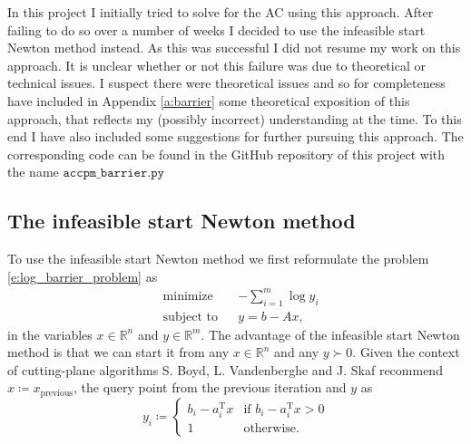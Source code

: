 \documentclass[11pt]{amsart}
\theoremstyle{definition}
\theoremstyle{remark}
\newcommand{\transpose}{\text{T}}
\begin{document}
        In this project I initially tried to solve for the AC using this approach. After failing to do so over a number of weeks I decided to use the infeasible start Newton method instead. As this was successful I did not resume my work on this approach. It is unclear whether or not this failure was due to theoretical or technical issues. I suspect there were theoretical issues and so for completeness have included in Appendix \ref{a:barrier} some theoretical exposition of this approach, that reflects
        my (possibly incorrect) understanding at the time. To this end I have also included some suggestions for further pursuing this approach. The corresponding code can be found in the GitHub repository of this project with the name $\texttt{accpm\_barrier.py}$ 

    \subsection{The infeasible start Newton method}\label{ss:infeasible} To use the infeasible start Newton method we first reformulate the problem \eqref{e:log_barrier_problem} as 
    \begin{equation}\label{e:log_barrier_problem_sub}
        \begin{aligned}
        & \text{minimize} && -\sum_{i=1}^m \log{y_i}  \\
        & \text{subject to} && y = b - Ax, 
        \end{aligned}
    \end{equation}
    in the variables $x \in \mathbb{R}^n$ and $y \in \mathbb{R}^m$. The advantage of the infeasible start Newton method is that we can start it from any $x \in \mathbb{R}^n$ and any $y \succ 0$. Given the context of cutting-plane algorithms S. Boyd, L. Vandenberghe and J. Skaf recommend $x \coloneqq x_\text{previous}$, the query point from the previous iteration and $y$ as 
    \begin{equation*}
        y_i \coloneqq
        \begin{cases} 
            b_i - a_i^\transpose x &\text{if $b_i - a_i^\transpose x > 0$}  \\
            1 &\text{otherwise.}
        \end{cases}     
    \end{equation*} 
\end{document}
